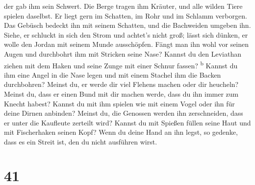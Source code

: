 der gab ihm sein Schwert.  Die Berge tragen ihm Kräuter,
und alle wilden Tiere spielen daselbst.  Er liegt gern im
Schatten, im Rohr und im Schlamm verborgen.  Das Gebüsch
bedeckt ihn mit seinem Schatten, und die Bachweiden umgeben ihn.
 Siehe, er schluckt in sich den Strom und achtet's nicht
groß; lässt sich dünken, er wolle den Jordan mit seinem Munde
ausschöpfen.  Fängt man ihn wohl vor seinen Augen und
durchbohrt ihm mit Stricken seine Nase?  Kannst du den
Leviathan ziehen mit dem Haken und seine Zunge mit einer Schnur fassen?
\textsuperscript{b}  Kannst du ihm eine Angel in die Nase
legen und mit einem Stachel ihm die Backen durchbohren? 
Meinst du, er werde dir viel Flehens machen oder dir heucheln?
 Meinst du, dass er einen Bund mit dir machen werde, dass
du ihn immer zum Knecht habest?  Kannst du mit ihm
spielen wie mit einem Vogel oder ihn für deine Dirnen anbinden?
 Meinst du, die Genossen werden ihn zerschneiden, dass er
unter die Kaufleute zerteilt wird?  Kannst du mit Spießen
füllen seine Haut und mit Fischerhaken seinen Kopf?  Wenn
du deine Hand an ihn legst, so gedenke, dass es ein Streit ist, den du
nicht ausführen wirst.

\hypertarget{section-40}{%
\section{41}\label{section-40}}

